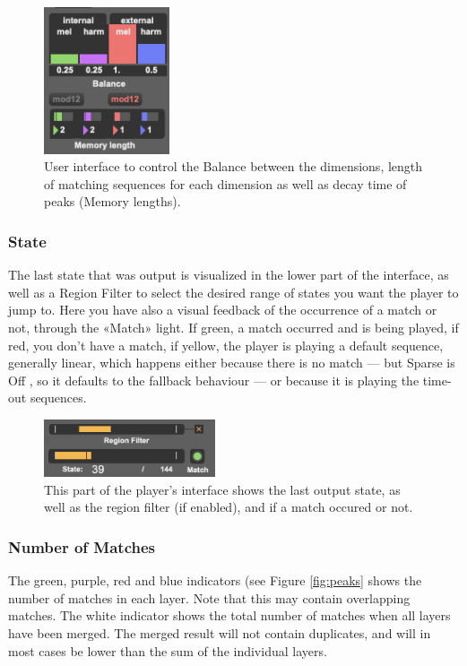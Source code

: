  \begin{figure}[h]
    \centering        
 	\includegraphics[width=0.33\textwidth]{img/atoms_ui_2-5.png}
    \caption{User interface to control the Balance between the dimensions, length of matching sequences for each dimension as well as decay time of peaks (Memory lengths).}
    \label{fig:atomui}
\end{figure}

\subsubsection{State} 
The last state that was output is visualized in the lower part of the interface, as well as a Region Filter to select the desired range of states you want the player to jump to. Here you have also a visual feedback of the occurrence of a match or not, through the «Match» light. If green, a match occurred and is being played, if red, you don't have a match, if yellow, the player is playing a default sequence, generally linear, which happens either because there is no match — but Sparse is Off , so it defaults to the fallback behaviour — or because it is playing the time-out sequences.
 \begin{figure}[h!]
    \centering        
 	\includegraphics[width=0.45\textwidth]{img/state.png}
    \caption{This part of the player's interface shows the last output state, as well as the region filter (if enabled), and if a match occured or not.}
    \label{fig:state}
\end{figure}

\subsubsection{Number of Matches}
The green, purple, red and blue indicators (see Figure \ref{fig:peaks} shows the number of matches in each layer. Note that this may contain overlapping matches. The white indicator shows the total number of matches when all layers have been merged. The merged result will not contain duplicates, and will in most cases be lower than the sum of the individual layers. 

